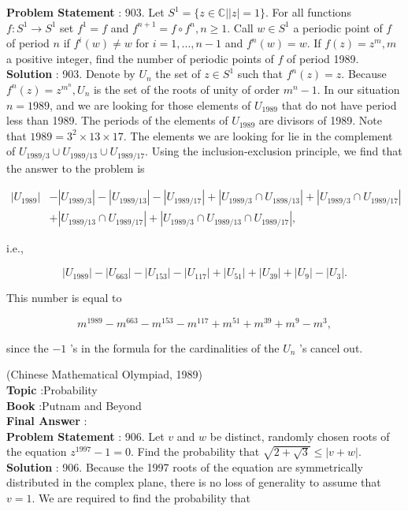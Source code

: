 \documentclass[10pt]{article}
\begin{document}
\textbf{Problem Statement} :
903. Let $S^{1}=\{z \in \mathbb{C}|| z \mid=1\}$. For all functions $f: S^{1} \rightarrow S^{1}$ set $f^{1}=f$ and $f^{n+1}=f \circ f^{n}, n \geq 1$. Call $w \in S^{1}$ a periodic point of $f$ of period $n$ if $f^{i}(w) \neq w$ for $i=1, \ldots, n-1$ and $f^{n}(w)=w$. If $f(z)=z^{m}, m$ a positive integer, find the number of periodic points of $f$ of period 1989.
\\
\textbf{Solution} :
903. Denote by $U_{n}$ the set of $z \in S^{1}$ such that $f^{n}(z)=z$. Because $f^{n}(z)=z^{m^{n}}, U_{n}$ is the set of the roots of unity of order $m^{n}-1$. In our situation $n=1989$, and we are looking for those elements of $U_{1989}$ that do not have period less than 1989. The periods of the elements of $U_{1989}$ are divisors of 1989. Note that $1989=3^{2} \times 13 \times 17$. The elements we are looking for lie in the complement of $U_{1989 / 3} \cup U_{1989 / 13} \cup U_{1989 / 17}$. Using the inclusion-exclusion principle, we find that the answer to the problem is

$$
\begin{aligned}
\left|U_{1989}\right| &-\left|U_{1989 / 3}\right|-\left|U_{1989 / 13}\right|-\left|U_{1989 / 17}\right|+\left|U_{1989 / 3} \cap U_{1898 / 13}\right|+\left|U_{1989 / 3} \cap U_{1989 / 17}\right| \\
&+\left|U_{1989 / 13} \cap U_{1989 / 17}\right|+\left|U_{1989 / 3} \cap U_{1989 / 13} \cap U_{1989 / 17}\right|,
\end{aligned}
$$

i.e.,

$$
\left|U_{1989}\right|-\left|U_{663}\right|-\left|U_{153}\right|-\left|U_{117}\right|+\left|U_{51}\right|+\left|U_{39}\right|+\left|U_{9}\right|-\left|U_{3}\right| .
$$

This number is equal to

$$
m^{1989}-m^{663}-m^{153}-m^{117}+m^{51}+m^{39}+m^{9}-m^{3},
$$

since the $-1$ 's in the formula for the cardinalities of the $U_{n}$ 's cancel out.

(Chinese Mathematical Olympiad, 1989)
\\
\textbf{Topic} :Probability\\
\textbf{Book} :Putnam and Beyond\\
\textbf{Final Answer} :\\


\textbf{Problem Statement} :
906. Let $v$ and $w$ be distinct, randomly chosen roots of the equation $z^{1997}-1=0$. Find the probability that $\sqrt{2+\sqrt{3}} \leq|v+w|$.
\\
\textbf{Solution} :
906. Because the 1997 roots of the equation are symmetrically distributed in the complex plane, there is no loss of generality to assume that $v=1$. We are required to find the probability that
\end{document}
